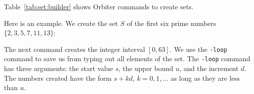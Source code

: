 Table~\ref{tab:set:builder} shows Orbiter commands to create sets.

\bigskip

Here is an example. 
We create the set $S$ of the first six prime numbers $\{2,3,5,7,11,13\}$:



\bigskip


The next command creates the integer interval $[0,63]$. 
We use the \verb'-loop' command to 
save us from typing out all elements of the set. 
The \verb'-loop' command has three arguments:
the start value $s$, the upper bound $u$, and the increment $d$.
The numbers created have the form $s+kd$, 
$k=0,1,\ldots$ as long as they are less than $u$.


\bigskip


